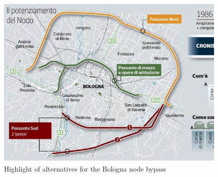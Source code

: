 \begin{figure}[h]
    \centering
    \includegraphics[width=0.75\linewidth]{figures/bologna-bypass.jpg}
    \caption{Highlight of alternatives for the Bologna node bypass}
    \label{fig:bologna-bypass}
\end{figure}
